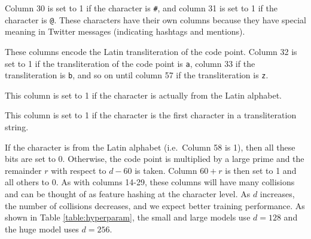 \documentclass[sigconf,anonymous,review]{acmart}
\newcommand{\str}[1]{\texttt{#1}}
\begin{document}
\begin{description}
\begin{description}[font=\normalfont\itshape]
\item[Columns 30-31:]
    Column 30 is set to 1 if the character is \str{\#},
    and column 31 is set to 1 if the character is \str{@}.
    These characters have their own columns because they have special meaning in Twitter messages
    (indicating hashtags and mentions).

\item[Columns 32-57:]
    These columns encode the Latin transliteration of the code point.
    Column 32 is set to 1 if the transliteration of the code point is \str{a},
    column 33 if the transliteration is \str{b},
    and so on until column 57 if the transliteration is \str{z}.

\item[Column 58:]
    This column is set to 1 if the character is actually from the Latin alphabet.

\item[Column 59:]
    This column is set to 1 if the character is the first character in a transliteration string.

\item[Columns 60-$d$:]
    If the character is from the Latin alphabet (i.e.\ Column 58 is 1), 
    then all these bits are set to 0.
    Otherwise, the code point is multiplied by a large prime and the remainder $r$ with respect to $d-60$ is taken.
    Column $60+r$ is then set to 1 and all others to 0.
    As with columns 14-29,
    these columns will have many collisions and can be thought of as feature hashing \citep{weinberger2009feature} at the character level.
    As $d$ increases, the number of collisions decreases, and we expect better training performance.
    As shown in Table \ref{table:hyperparam}, the small and large models use $d=128$ and the huge model uses $d=256$.
\end{description}


\end{description}
\end{document}
